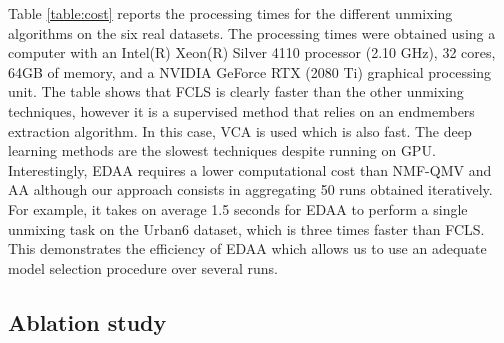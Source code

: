Table \ref{table:cost} reports the processing times for the different unmixing
algorithms on the six real datasets. 
The processing times were obtained using a computer with an Intel(R) Xeon(R)
Silver 4110 processor (2.10 GHz), 32 cores, 64GB of memory, and a NVIDIA
GeForce RTX (2080 Ti) graphical processing unit.
The table shows that FCLS is clearly faster than the other unmixing techniques,
however it is a supervised method that relies on an endmembers extraction
algorithm. In this case, VCA is used which is also fast.
The deep learning methods are the slowest techniques despite running on GPU.
Interestingly, EDAA requires a lower computational cost than NMF-QMV and AA although our approach consists in aggregating 50 runs obtained
iteratively. 
For example, it takes on average 1.5 seconds for EDAA to perform a single unmixing
task on the Urban6 dataset, which is three times faster than FCLS. 
This demonstrates the efficiency of EDAA which allows us to use an
adequate model selection procedure over several runs.

\begin{table}[h]
  \centering
  \begin{adjustbox}{width=\textwidth}
    
  \end{adjustbox}
  \label{table:cost}
\end{table}

\subsection{Ablation study}

